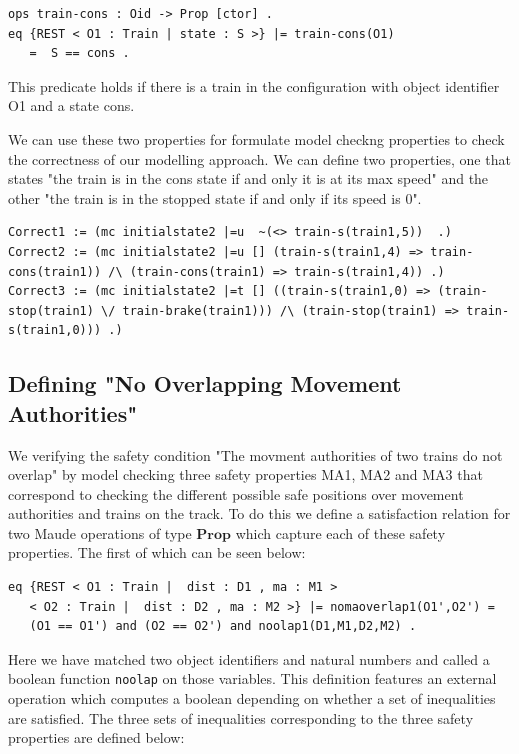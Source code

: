 \begin{lstlisting}[caption = The cons state property]
ops train-cons : Oid -> Prop [ctor] .
eq {REST < O1 : Train | state : S >} |= train-cons(O1) 
   =  S == cons . 
\end{lstlisting}


This predicate holds if there is a train in the configuration with object identifier O1 and a state cons. 

We can use these two properties for formulate model checkng properties to check the correctness of our modelling approach. We can define two properties, one that states "the train is in the cons state if and only it is at its max speed" and the other "the train is in the stopped state if and only if its speed is 0". 

\begin{lstlisting}
Correct1 := (mc initialstate2 |=u  ~(<> train-s(train1,5))  .)
Correct2 := (mc initialstate2 |=u [] (train-s(train1,4) => train-cons(train1)) /\ (train-cons(train1) => train-s(train1,4)) .)
Correct3 := (mc initialstate2 |=t [] ((train-s(train1,0) => (train-stop(train1) \/ train-brake(train1))) /\ (train-stop(train1) => train-s(train1,0))) .)
\end{lstlisting}


\subsection*{Defining "No Overlapping Movement Authorities"}
We verifying the safety condition "The movment authorities of two trains do not overlap" by model checking three safety properties MA1, MA2 and MA3 that correspond to checking the different possible safe positions over movement authorities and trains on the track. To do this we define a satisfaction relation for two Maude operations of type $\mathbf{Prop}$ which capture each of these safety properties. The first of which can be seen below:

\begin{lstlisting}
eq {REST < O1 : Train |  dist : D1 , ma : M1 > 
   < O2 : Train |  dist : D2 , ma : M2 >} |= nomaoverlap1(O1',O2') = 
   (O1 == O1') and (O2 == O2') and noolap1(D1,M1,D2,M2) .
\end{lstlisting}

Here we have matched two object identifiers and natural numbers and called a boolean function \texttt{noolap} on those variables. This definition features an external operation which computes a boolean depending on whether a set of inequalities are satisfied. The three sets of inequalities corresponding to the three safety properties are defined below:

